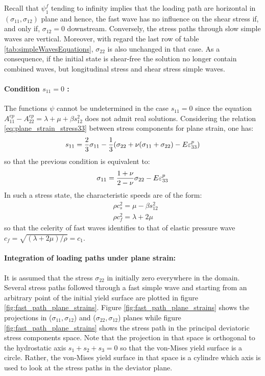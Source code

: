 Recall that $\psi^f_1$ tending to infinity implies that the loading path are horizontal in $(\sigma_{11},\sigma_{12})$ plane and hence, the fast wave has no influence on the shear stress if, and only if, $\sigma_{12}=0$ downstream. Conversely, the stress paths through slow simple waves are vertical. Moreover, with regard the last row of table \ref{tab:simpleWavesEquations}, $\sigma_{22}$ is also unchanged in that case. As a consequence, if the initial state is shear-free the solution no longer contain combined waves, but longitudinal stress and shear stress simple waves.

\paragraph*{Condition $s_{11}=0$ :} The functions $\psi$ cannot be undetermined in the case $s_{11}=0$ since the equation $A_{11}^{ep}-A_{22}^{ep}=\lambda + \mu + \beta s_{12}^2$ does not admit real solutions. Considering the relation \eqref{eq:plane_strain_stress33} between stress components for plane strain, one has:
\begin{equation*}
  s_{11}= \frac{2}{3}\sigma_{11}-\frac{1}{3}(\sigma_{22}+\nu(\sigma_{11}+\sigma_{22})-E\varepsilon^p_{33})
\end{equation*}
so that the previous condition is equivalent to:
\begin{equation}
  \label{eq:plane_strain_s11=0}
  \sigma_{11}=\frac{1+\nu}{2-\nu}\sigma_{22}-E\varepsilon^p_{33}
\end{equation}
In such a stress state, the characteristic speeds are of the form:
\begin{align*}
  & \rho c_s^2 = \mu -\beta s_{12}^2 \\
  & \rho c_f^2 = \lambda +2\mu 
\end{align*}
so that the celerity of fast waves identifies to that of elastic pressure wave $c_f=\sqrt{(\lambda + 2\mu)/\rho}=c_1$.


\paragraph*{Integration of loading paths under plane strain:}
It is assumed that the stress $\sigma_{22}$ in initially zero everywhere in the domain. Several stress paths followed through a fast simple wave and starting from an arbitrary point of the initial yield surface are plotted in figure \ref{fig:fast_path_plane_strains}. Figure \ref{fig:fast_path_plane_strains} shows the projections in ($\sigma_{11},\sigma_{12}$) and ($\sigma_{22},\sigma_{12}$) planes while figure \ref{fig:fast_path_plane_strains} shows the stress path in the principal deviatoric stress components space. Note that the projection in that space is orthogonal to the hydrostatic axis $s_1+s_2+s_3=0$ so that the von-Mises yield surface is a circle. Rather, the von-Mises yield surface in that space is a cylindre which axis is used to look at the stress paths in the deviator plane.

